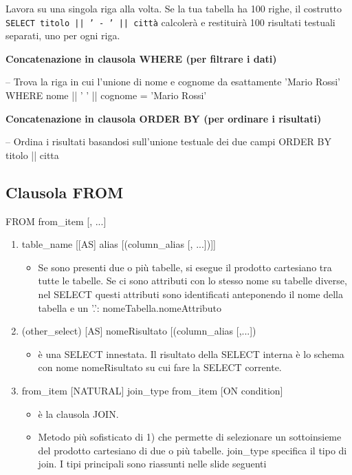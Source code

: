Lavora su una singola riga alla volta. Se la tua tabella ha 100 righe, il costrutto \texttt{SELECT titolo || ' - ' || città} calcolerà e restituirà 100 risultati testuali separati, uno per ogni riga.



\textbf{\large Concatenazione in clausola WHERE (per filtrare i dati)}
\begin{codiceSQL}
  -- Trova la riga in cui l'unione di nome e cognome da esattamente 'Mario Rossi'
WHERE nome || ' ' || cognome = 'Mario Rossi'
\end{codiceSQL}

\textbf{\large Concatenazione in clausola ORDER BY (per ordinare i risultati)}
\begin{codiceSQL}
  -- Ordina i risultati basandosi sull'unione testuale dei due campi
ORDER BY titolo || citta
\end{codiceSQL}



\subsection{Clausola FROM}
\begin{codiceSQL}
  FROM from_item [, ...]
\end{codiceSQL}

\begin{enumerate}
  \item  table\_name [[AS] alias [(column\_alias [, ...])]]
  \begin{itemize}
    \item Se sono presenti due o più tabelle, si esegue il prodotto cartesiano tra tutte le  tabelle. Se ci sono attributi con lo stesso nome su tabelle diverse, nel SELECT 
questi attributi sono identificati anteponendo il nome della tabella e un ’.’: 
nomeTabella.nomeAttributo
  \end{itemize}

  \item  (other\_select) [AS] nomeRisultato [(column\_alias [,...])
  \begin{itemize}
    \item  è una SELECT innestata. Il risultato della SELECT interna è lo schema con nome 
nomeRisultato su cui fare la SELECT corrente.
  \end{itemize}

  \item  from\_item [NATURAL] join\_type from\_item [ON condition]
  \begin{itemize}
    \item  è la clausola JOIN.
    \item Metodo più sofisticato di 1) che permette di selezionare un sottoinsieme del 
prodotto cartesiano di due o più tabelle. join\_type specifica il tipo di join. I tipi 
principali sono riassunti nelle slide seguenti
  \end{itemize}
\end{enumerate}


